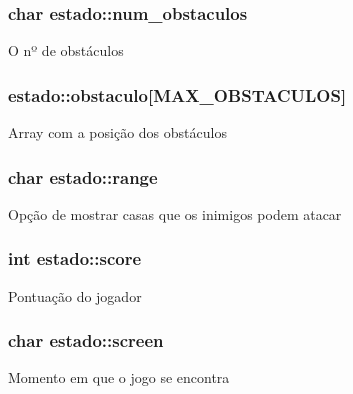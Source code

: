 \subsubsection[{\texorpdfstring{num\+\_\+obstaculos}{num_obstaculos}}]{\setlength{\rightskip}{0pt plus 5cm}char estado\+::num\+\_\+obstaculos}\hypertarget{structestado_ac1a8a541e2301189833c6f713c416063}{}\label{structestado_ac1a8a541e2301189833c6f713c416063}
O nº de obstáculos 
\subsubsection[{\texorpdfstring{obstaculo}{obstaculo}}]{ estado\+::obstaculo\mbox{[}{\bf M\+A\+X\+\_\+\+O\+B\+S\+T\+A\+C\+U\+L\+OS}\mbox{]}}\hypertarget{structestado_a970dc20c6687acb17c3f08c06edbed4f}{}\label{structestado_a970dc20c6687acb17c3f08c06edbed4f}
Array com a posição dos obstáculos 
\subsubsection[{\texorpdfstring{range}{range}}]{\setlength{\rightskip}{0pt plus 5cm}char estado\+::range}\hypertarget{structestado_a813cb0f2927179b6139566f846c77018}{}\label{structestado_a813cb0f2927179b6139566f846c77018}
Opção de mostrar casas que os inimigos podem atacar 
\subsubsection[{\texorpdfstring{score}{score}}]{\setlength{\rightskip}{0pt plus 5cm}int estado\+::score}\hypertarget{structestado_a47e99ef4241dfe72d9d68244a68adb46}{}\label{structestado_a47e99ef4241dfe72d9d68244a68adb46}
Pontuação do jogador 
\subsubsection[{\texorpdfstring{screen}{screen}}]{\setlength{\rightskip}{0pt plus 5cm}char estado\+::screen}\hypertarget{structestado_a9e83d6dd64bf8e642bd6089ed0429c9c}{}\label{structestado_a9e83d6dd64bf8e642bd6089ed0429c9c}
Momento em que o jogo se encontra 
